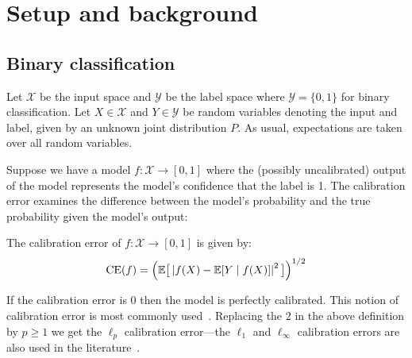 \section{Setup and background}
\label{sec:formulation}

\newcommand{\ce}[0]{\ensuremath{\textup{CE}}}
\newcommand{\lpce}[0]{\ensuremath{\ell_p\textup{-CE}}}
\newcommand{\ltwoce}[0]{\ensuremath{\ell_2\textup{-CE}}}
\newcommand{\lsquared}[0]{\ensuremath{L^2}}
\newcommand{\squaredce}[0]{\ensuremath{L^2\textup{-CE}}}
\newcommand{\topce}[0]{\ensuremath{\textup{TCE}}}
\newcommand{\margsquaredce}[0]{\ensuremath{\textup{MCE}}}
\newcommand{\mse}[0]{\ensuremath{\textup{MSE}}}

\subsection{Binary classification}

Let $\mathcal{X}$ be the input space and $\mathcal{Y}$ be the label space where $\mathcal{Y} = \{0, 1\}$ for binary classification.
Let $X \in \mathcal{X}$ and $Y \in \mathcal{Y}$ be random variables denoting the input and label, given by an unknown joint distribution $P$. As usual, expectations are taken over all random variables.

Suppose we have a model $f : \mathcal{X} \to [0, 1]$ where the (possibly uncalibrated) output of the model represents the model's confidence that the label is 1. The calibration error examines the difference between the model's probability and the true probability given the model's output:

\begin{definition}
The calibration error of $f : \mathcal{X} \to [0, 1]$ is given by:
\begin{align}
\ce(f) = \Big(\expect\big[ \left|f(X) - \expect[Y \mid f(X)] \right|^2 \big] \Big)^{1/2}
\end{align}
\end{definition}

If the calibration error is $0$ then the model is perfectly calibrated. This notion of calibration error is most commonly used~\cite{murphy1973vector,murphy1977reliability,degroot1983forecasters, nguyen2015posterior, hendrycks2019anomaly, kuleshov2015calibrated, hendrycks2019pretraining, brocker2012empirical}. Replacing the $2$ in the above definition by $p \geq 1$ we get the $\ell_p$ calibration error---the $\ell_1$ and $\ell_{\infty}$ calibration errors are also used in the literature~\cite{guo2017calibration, naeini2015obtaining, nixon2019calibration}. 

